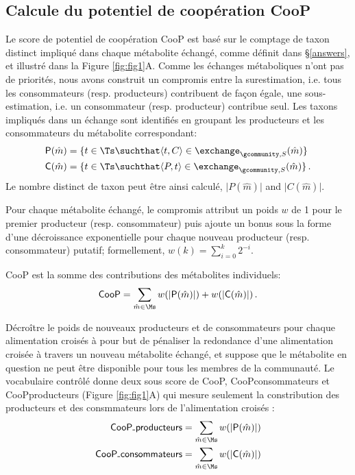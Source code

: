 \subsection{Calcule du potentiel de coopération \textsf{CooP}} Le score de potentiel de coopération \textsf{CooP} est basé sur le comptage de taxon distinct impliqué dans chaque métabolite échangé, comme définit dans \S\ref{answers}, et illustré dans la Figure  \ref{fig:fig1}A. Comme les échanges métaboliques n'ont pas de priorités, nous avons construit un compromis entre la surestimation, i.e. tous les consommateurs (resp. producteurs) contribuent de façon égale, une sous-estimation, i.e. un consommateur (resp. producteur) contribue seul. Les taxons impliqués dans un échange sont identifiés en groupant les producteurs et les consommateurs du métabolite correspondant: 
\[
\begin{split}
    \textsf{P}(\hat{m}) & =
        \{ t\in \Ts \suchthat \langle t, C \rangle \in \exchange_{\gcommunity, S}(\hat{m}) \} \\
    \textsf{C}(\hat{m}) & =
        \{ t\in \Ts \suchthat \langle P, t \rangle \in \exchange_{\gcommunity, S}(\hat{m}) \} \,. 
\end{split}
\]
Le nombre distinct de taxon peut être ainsi calculé, \( \vert P(\hat{m}) \vert \) and \( \vert C(\hat{m}) \vert \).

Pour chaque métabolite échangé, le compromis attribut un poids $w$ de 1 pour le premier producteur (resp. consommateur) puis ajoute un bonus sous la forme d'une décroissance exponentielle pour chaque nouveau producteur (resp. consommateur) putatif; formellement, 
\(
w(k) = \sum_{i=0}^k 2^{-i}
\).

\textsf{CooP} est la somme des contributions des métabolites individuels: 
\[
    \textsf{CooP} = \sum\limits_{\hat{m}\in\Ms}
                    w(\vert\textsf{P}(\hat{m})\vert) + 
                    w(\vert\textsf{C}(\hat{m})\vert) \,.
\]

Décroître le poids de nouveaux producteurs et de consommateurs pour chaque alimentation croisés à pour but de pénaliser la redondance d'une alimentation croisée à travers un nouveau métabolite échangé, et suppose que le métabolite en question ne peut être disponible pour tous les membres de la communauté. Le vocabulaire contrôlé donne deux sous score de \textsf{CooP}, \textsf{CooP\raisebox{-0.4ex}{-}consommateurs} et \textsf{CooP\raisebox{-0.4ex}{-}producteurs} (Figure \ref{fig:fig1}A) qui mesure seulement la constribution des producteurs et des consmmateurs lors de l'alimentation croisés :
\[
\begin{split}
    \textsf{CooP\raisebox{-0.4ex}{-}producteurs} & =  \sum\limits_{\hat{m}\in\Ms} w(\vert\textsf{P}(\hat{m})\vert) \\
    \textsf{CooP\raisebox{-0.4ex}{-}consommateurs} & =  \sum\limits_{\hat{m}\in\Ms} w(\vert\textsf{C}(\hat{m})\vert)
\end{split}
\]

